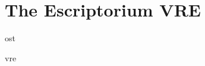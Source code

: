 \documentclass[a4paper, 12pt]{book}
\begin{document}
\part{The Escriptorium VRE}
\cleardoublepage
\begin{refsection}
{ost}
\printbibliography[heading=subbibliography]
\end{refsection}
\begin{refsection}
{vre}
\printbibliography[heading=subbibliography]
\end{refsection}

\begin{appendices}

\end{appendices}

\printbibliography
\end{document}
